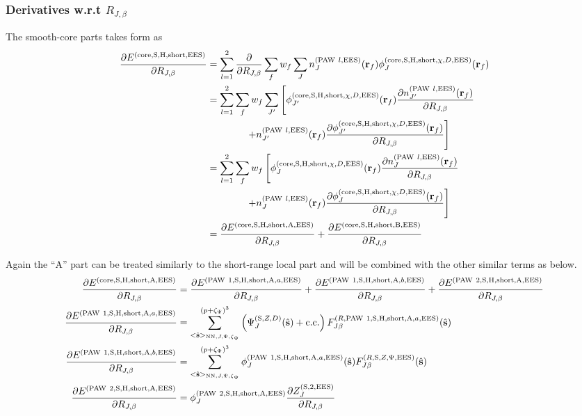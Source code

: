 \documentclass[paper=a4, fontsize=11pt]{article} %
\numberwithin{equation}{section} %
\numberwithin{figure}{section} %
\numberwithin{table}{section} %
\newcommand{\p}{\partial}
\newcommand{\bs}{{\bf{s}}}
\newcommand{\br}{{\bf{r}}}
\newcommand{\hs}{{\hat{\bf{s}}}}
\newcommand{\rS}{{\mathrm{S}}}
\newcommand{\rEES}{{\mathrm{EES}}}
\newcommand{\rcore}{{\mathrm{core}}}
\newcommand{\rNN}{{\mathrm{NN}}}
\newcommand{\rshort}{{\mathrm{short}}}
\newcommand{\rcc}{{\mathrm{c.c.}}}
\newcommand{\rP}{{\mathrm{PAW}}}
\newcommand{\rH}{{\mathrm{H}}}
\newcommand{\rA}{{\mathrm{A}}}
\newcommand{\rB}{{\mathrm{B}}}
\newcommand{\RJb}{{R_{J,\beta}}}
\newcommand{\pzp}{{(p+\zeta_{\Psi})^3}}
\newcommand{\hsJp}{{<\hs>_{\rNN,J,\Psi,\zeta_\Psi}}}
\begin{document}
\subsubsection{Derivatives w.r.t $\RJb$}
The smooth-core parts takes form as
\begin{equation}\label{eq:dEHSldR}
\begin{split}
\frac{\p E^{(\rcore,\rS,\rH,\rshort,\rEES)}}{\p \RJb}
&= \sum_{l=1}^2\frac{\p }{\p \RJb}\sum_f w_f \sum_J n_J^{(\rP\ l,\rEES)}(\br_f) \phi_J^{(\rcore,\rS,\rH,\rshort,\chi,D,\rEES)}(\br_f) \\
&= \sum_{l=1}^2\sum_f w_f \sum_{J'} \left[\phi_{J'}^{(\rcore,\rS,\rH,\rshort,\chi,D,\rEES)}(\br_f)\frac{\p n_{J'}^{(\rP\ l,\rEES)}(\br_f)}{\p \RJb}
\right.\\
&\left. \ \ \ \ \ \ \ \ \ \ \ \ +n_{J'}^{(\rP\ l,\rEES)}(\br_f) \frac{\p \phi_{J'}^{(\rcore,\rS,\rH,\rshort,\chi,D,\rEES)}(\br_f)}{\p \RJb} \right]\\
&= \sum_{l=1}^2\sum_f w_f \left[\phi_J^{(\rcore,\rS,\rH,\rshort,\chi,D,\rEES)}(\br_f)\frac{\p n_J^{(\rP\ l,\rEES)}(\br_f)}{\p \RJb}\right.\\
&\left. \ \ \ \ \ \ \ \ \ \ \ \ +n_J^{(\rP\ l,\rEES)}(\br_f) \frac{\p \phi_J^{(\rcore,\rS,\rH,\rshort,\chi,D,\rEES)}(\br_f)}{\p \RJb} \right]\\
& = \frac{\p E^{(\rcore,\rS,\rH,\rshort,\rA,\rEES)}}{\p \RJb} + \frac{\p E^{(\rcore,\rS,\rH,\rshort,\rB,\rEES)}}{\p \RJb}
\end{split}
\end{equation}

Again the ``$\rA$'' part can be treated similarly to the short-range local part and will be combined with the other similar terms as below.\\

\begin{equation}
\begin{split}
\frac{\p E^{(\rcore,\rS,\rH,\rshort,\rA,\rEES)}}{\p \RJb}
&= \frac{\p E^{(\rP\ 1,\rS,\rH,\rshort,\rA,a,\rEES)}}{\p \RJb}+\frac{\p E^{(\rP\ 1,\rS,\rH,\rshort,\rA,b,\rEES)}}{\p \RJb}+\frac{\p E^{(\rP\ 2,\rS,\rH,\rshort,\rA,\rEES)}}{\p \RJb} \\
\frac{\p E^{(\rP\ 1,\rS,\rH,\rshort,\rA,a,\rEES)}}{\p \RJb}&= \sum_{\hsJp}^{\pzp} \left(\Psi_J^{(\rS,Z,D)}(\hat \bs)+ \rcc\right) F_{J\beta}^{(R,\rP\ 1,\rS,\rH,\rshort,\rA,a,\rEES)}(\hs)\\
\frac{\p E^{(\rP\ 1,\rS,\rH,\rshort,\rA,b,\rEES)}}{\p \RJb}&= \sum_{\hsJp}^{\pzp} \phi_J^{(\rP\ 1,\rS,\rH,\rshort,\rA,a,\rEES)}(\hs)F_{J\beta}^{(R,\rS,Z,\Psi,\rEES)}(\hs) \\
\frac{\p E^{(\rP\ 2,\rS,\rH,\rshort,\rA,\rEES)}}{\p \RJb}&=\phi_J^{(\rP\ 2,\rS,\rH,\rshort,\rA,\rEES)}\frac{\p Z_{J}^{(\rS,2,\rEES)}}{\p \RJb}\\
\end{split}
\end{equation}
\end{document}
